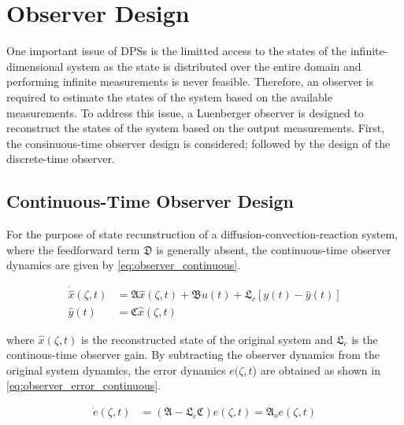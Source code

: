 \section{Observer Design}

One important issue of DPSs is the limitted access to the states of the infinite-dimensional system as the state is distributed over the entire domain and performing infinite measurements is never feasible. Therefore, an observer is required to estimate the states of the system based on the available measurements. To address this issue, a Luenberger observer is designed to reconstruct the states of the system based on the output measurements. First, the consinuous-time observer design is considered; followed by the design of the discrete-time observer.

\subsection{Continuous-Time Observer Design}

For the purpose of state recunstruction of a diffusion-convection-reaction system, where the feedforward term $\mathfrak{D}$ is generally absent, the continuous-time observer dynamics are given by \eqref{eq:observer_continuous}.

\begin{equation} \label{eq:observer_continuous}
    \begin{aligned}
        \dot{\hat{x}}(\zeta, t) &= \mathfrak{A} \hat{x}(\zeta, t) + \mathfrak{B} u(t) + \mathfrak{L}_c [y(t) - \hat{y}(t)] \\
        \hat{y}(t) &= \mathfrak{C} \hat{x}(\zeta, t)
    \end{aligned}
\end{equation}

where $\hat{x}(\zeta, t)$ is the reconstructed state of the original system and $\mathfrak{L}_c$ is the continous-time observer gain. By subtracting the observer dynamics from the original system dynamics, the error dynamics $e(\zeta,t$) are obtained as shown in \eqref{eq:observer_error_continuous}.

\begin{equation} \label{eq:observer_error_continuous}
    \begin{aligned}
        \dot{e}(\zeta, t) &= (\mathfrak{A} - \mathfrak{L}_c \mathfrak{C}) e(\zeta, t) = \mathfrak{A}_o e(\zeta,t) \\
    \end{aligned}
\end{equation}

